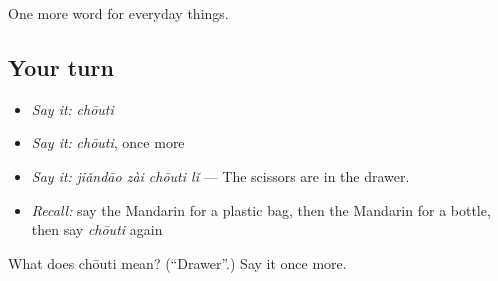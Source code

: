 \begin{grammarlens}[title={What you've built}]
One more word for everyday things.
\end{grammarlens}

\subsection*{Your turn}
\begin{itemize}
\raggedright
  \item \emph{Say it:} \emph{chōuti}
  \item \emph{Say it:} \emph{chōuti}, once more
  \item \emph{Say it:} \emph{jiǎndāo zài chōuti lǐ} — The scissors are in the drawer.
  \item \emph{Recall:} say the Mandarin for a plastic bag, then the Mandarin for a bottle, then say \emph{chōuti} again
\end{itemize}

\begin{tcolorbox}[breakable,colback=teal!4,colframe=teal!35!black,title={Before you move on}]
What does chōuti mean? (\textquotedblleft{}Drawer\textquotedblright{}.) Say it once more.
\end{tcolorbox}
